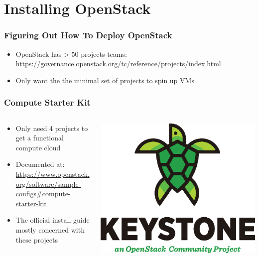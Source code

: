 \documentclass[aspectratio=169,11pt,hyperref={colorlinks=true}]{beamer}
\begin{document}
\section{Installing OpenStack}
\begin{frame}
    \frametitle{Figuring Out How To Deploy OpenStack}
    \begin{itemize}
        \item OpenStack has > 50 projects teams: \href{https://governance.openstack.org/tc/reference/projects/index.html}{https://governance.openstack.org/tc/reference/projects/index.html}
        \item Only want the the minimal set of projects to spin up VMs
    \end{itemize}
\end{frame}

\begin{frame}
    \frametitle{Compute Starter Kit}
    \begin{columns}[T]
        \begin{column}{.48\textwidth}
            \begin{itemize}
                \item Only need 4 projects to get a functional compute cloud
                \item Documented at:\\ \small \href{https://www.openstack.org/software/sample-configs\#compute-starter-kit}{https://www.openstack.org/software/sample-configs\#compute-starter-kit}
                \item \normalsize The official install guide mostly concerned with these projects
            \end{itemize}
        \end{column}
        \begin{column}{.48\textwidth}
            \includegraphics[height=.25\textheight]{mascots/keystone.eps}

\end{column}
\end{columns}
\end{frame}
\end{document}
